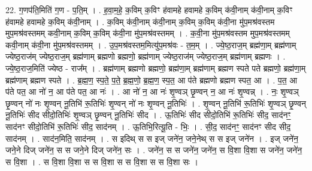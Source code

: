 \documentclass[17pt]{extarticle}
\begin{document}
22. ग॒णप॑ति॒मिति॑ ग॒ण - प॒ति॒म् । . ह॒वा॒म॒हे॒ क॒विम् क॒विꣳ ह॑वामहे हवामहे क॒विम् क॑वी॒नाम् क॑वी॒नाम् क॒विꣳ ह॑वामहे हवामहे क॒विम् क॑वी॒नाम् । . क॒विम् क॑वी॒नाम् क॑वी॒नाम् क॒विम् क॒विम् क॑वी॒ना मु॑प॒मश्र॑वस्तम मुप॒मश्र॑वस्तमम् कवी॒नाम् क॒विम् क॒विम् क॑वी॒ना मु॑प॒मश्र॑वस्तमम् । . क॒वी॒ना मु॑प॒मश्र॑वस्तम मुप॒मश्र॑वस्तमम् कवी॒नाम् क॑वी॒ना मु॑प॒मश्र॑वस्तमम् । . उ॒प॒मश्र॑वस्तम॒मित्यु॑प॒मश्र॑वः - त॒म॒म् । . ज्ये॒ष्ठ॒राज॒म् ब्रह्म॑णा॒म् ब्रह्म॑णाम् ज्येष्ठ॒राज॑म् ज्येष्ठ॒राज॒म् ब्रह्म॑णाम् ब्रह्मणो ब्रह्मणो॒ ब्रह्म॑णाम् ज्येष्ठ॒राज॑म् ज्येष्ठ॒राज॒म् ब्रह्म॑णाम् ब्रह्मणः । . ज्ये॒ष्ठ॒राज॒मिति॑ ज्येष्ठ - राज᳚म् । . ब्रह्म॑णाम् ब्रह्मणो ब्रह्मणो॒ ब्रह्म॑णा॒म् ब्रह्म॑णाम् ब्रह्मण स्पते पते ब्रह्मणो॒ ब्रह्म॑णा॒म् ब्रह्म॑णाम् ब्रह्मण स्पते । . ब्र॒ह्म॒ण॒ स्प॒ते॒ प॒ते॒ ब्र॒ह्म॒णो॒ ब्र॒ह्म॒ण॒ स्प॒त॒ आ प॑ते ब्रह्मणो ब्रह्मण स्पत॒ आ । . प॒त॒ आ प॑ते पत॒ आ नो॑ न॒ आ प॑ते पत॒ आ नः॑ । . आ नो॑ न॒ आ नः॑ शृ॒ण्वञ् छृ॒ण्वन् न॒ आ नः॑ शृ॒ण्वन्न् । . नः॒ शृ॒ण्वञ् छृ॒ण्वन् नो॑ नः शृ॒ण्वन् नू॒तिभि॑ रू॒तिभिः॑ शृ॒ण्वन् नो॑ नः शृ॒ण्वन् नू॒तिभिः॑ । . शृ॒ण्वन् नू॒तिभि॑ रू॒तिभिः॑ शृ॒ण्वञ् छृ॒ण्वन् नू॒तिभिः॑ सीद सीदो॒तिभिः॑ शृ॒ण्वञ् छृ॒ण्वन् नू॒तिभिः॑ सीद । . ऊ॒तिभिः॑ सीद सीदो॒तिभि॑ रू॒तिभिः॑ सीद॒ साद॑नꣳ॒॒ साद॑नꣳ सीदो॒तिभि॑ रू॒तिभिः॑ सीद॒ साद॑नम् । . ऊ॒तिभि॒रित्यू॒ति - भिः॒ । . सी॒द॒ साद॑नꣳ॒॒ साद॑नꣳ सीद सीद॒ साद॑नम् । . साद॑न॒मिति॒ साद॑नम् । . स इदिथ् स स इज् जने॑न॒ जने॒नेथ् स स इज् जने॑न । . इज् जने॑न॒ जने॒ने दिज् जने॑न॒ स स जने॒ने दिज् जने॑न॒ सः । . जने॑न॒ स स जने॑न॒ जने॑न॒ स वि॒शा वि॒शा स जने॑न॒ जने॑न॒ स वि॒शा । . स वि॒शा वि॒शा स स वि॒शा स स वि॒शा स स वि॒शा सः । \newline
\end{document}
